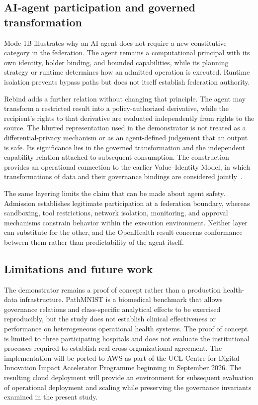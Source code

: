 \documentclass[twoside,11pt]{article}
\begin{document}
\subsection{AI-agent participation and governed transformation}

Mode 1B illustrates why an AI agent does not require a new constitutive category in the federation. The agent remains a computational principal with its own identity, holder binding, and bounded capabilities, while its planning strategy or runtime determines how an admitted operation is executed. Runtime isolation prevents bypass paths but does not itself establish federation authority.

Rebind adds a further relation without changing that principle. The agent may transform a restricted result into a policy-authorized derivative, while the recipient's rights to that derivative are evaluated independently from rights to the source. The blurred representation used in the demonstrator is   not treated as a differential-privacy mechanism or as an agent-defined judgement that an output is safe. Its significance lies in the governed transformation and the independent capability relation attached to subsequent consumption. The construction provides an operational connection to the earlier Value--Identity Model, in which transformations of data and their governance bindings are considered jointly~\cite{Fenoglio_RSOS_2026}.

The same layering limits the claim that can be made about agent safety. Admission establishes legitimate participation at a federation boundary, whereas sandboxing, tool restrictions, network isolation, monitoring, and approval mechanisms constrain behavior within the execution environment. Neither layer can substitute for the other, and the OpenHealth result concerns conformance between them rather than predictability of the agent itself.

\subsection{Limitations and future work}
The demonstrator remains a proof of concept rather than a production health-data infrastructure. PathMNIST is a biomedical benchmark that allows governance relations and class-specific analytical effects to be exercised reproducibly, but the study does not establish clinical effectiveness or performance on heterogeneous operational health systems. The proof of concept is limited to three participating hospitals and does not evaluate the institutional processes required to establish real cross-organizational agreement. The implementation will be ported to AWS as part of the UCL Centre for Digital Innovation Impact Accelerator Programme beginning in September 2026. The resulting cloud deployment will provide an environment for subsequent evaluation of operational deployment and scaling while preserving the governance invariants examined in the present study.
\end{document}
